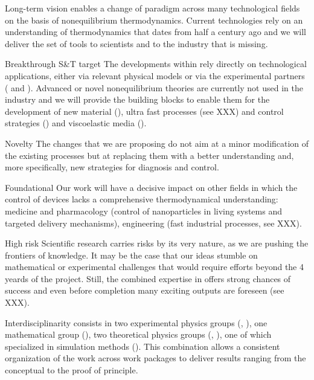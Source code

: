 \begin{compactdesc}
\item[Long-term vision] \TheProject enables a change of paradigm across many technological
fields on the basis of nonequilibrium thermodynamics. Current technologies rely on an
understanding of thermodynamics that dates from half a century ago and we will deliver the
set of tools to scientists and to the industry that is missing.
\item[Breakthrough S\&T target] The developments within \TheProject rely directly on
technological applications, either via relevant physical models or via the experimental
partners ( and ). Advanced or novel nonequilibrium theories are
currently not used in the industry and we will provide the building blocks to enable them
for the development of new material (), ultra fast processes (see XXX)
and control strategies () and viscoelastic media ().
\item[Novelty] The changes that we are proposing do not aim at a minor modification of the
existing processes but at replacing them with a better understanding and, more specifically,
new strategies for diagnosis and control.
\item[Foundational] Our work will have a decisive impact on other fields in which the
control of devices lacks a comprehensive thermodynamical understanding: medicine and
pharmacology (control of nanoparticles in living systems and targeted delivery mechanisms),
engineering (fast industrial processes, see XXX).
\item[High risk] Scientific research carries risks by its very nature, as we are pushing the
frontiers of knowledge. It may be the case that our ideas stumble on mathematical or
experimental challenges that would require efforts beyond the 4 yeards of the
project. Still, the combined expertise in \TheProject offers strong chances of success and
even before completion many exciting outputs are foreseen (see XXX).
\item[Interdisciplinarity] \TheProject consists in two experimental physics groups
(, ), one mathematical group (), two theoretical physics
groups (, ), one of which specialized in simulation methods
(). This combination allows a consistent organization of the work across work
packages to deliver results ranging from the conceptual to the proof of principle.
\end{compactdesc}

